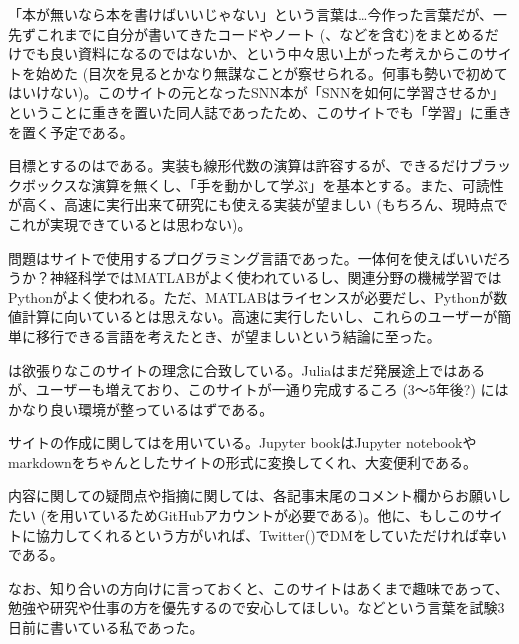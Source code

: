 \documentclass[letterpaper,10pt,english]{sphinxmanual}
\begin{document}
「本が無いなら本を書けばいいじゃない」という言葉は…今作った言葉だが、一先ずこれまでに自分が書いてきたコードやノート (、などを含む)をまとめるだけでも良い資料になるのではないか、という中々思い上がった考えからこのサイトを始めた (目次を見るとかなり無謀なことが察せられる。何事も勢いで初めてはいけない)。このサイトの元となったSNN本が「SNNを如何に学習させるか」ということに重きを置いた同人誌であったため、このサイトでも「学習」に重きを置く予定である。

目標とするのはである。実装も線形代数の演算は許容するが、できるだけブラックボックスな演算を無くし、「手を動かして学ぶ」を基本とする。また、可読性が高く、高速に実行出来て研究にも使える実装が望ましい (もちろん、現時点でこれが実現できているとは思わない)。

問題はサイトで使用するプログラミング言語であった。一体何を使えばいいだろうか？神経科学ではMATLABがよく使われているし、関連分野の機械学習ではPythonがよく使われる。ただ、MATLABはライセンスが必要だし、Pythonが数値計算に向いているとは思えない。高速に実行したいし、これらのユーザーが簡単に移行できる言語を考えたとき、が望ましいという結論に至った。

は欲張りなこのサイトの理念に合致している。Juliaはまだ発展途上ではあるが、ユーザーも増えており、このサイトが一通り完成するころ (3～5年後?) にはかなり良い環境が整っているはずである。

サイトの作成に関してはを用いている。Jupyter bookはJupyter notebookやmarkdownをちゃんとしたサイトの形式に変換してくれ、大変便利である。

内容に関しての疑問点や指摘に関しては、各記事末尾のコメント欄からお願いしたい (を用いているためGitHubアカウントが必要である)。他に、もしこのサイトに協力してくれるという方がいれば、Twitter()でDMをしていただければ幸いである。

なお、知り合いの方向けに言っておくと、このサイトはあくまで趣味であって、勉強や研究や仕事の方を優先するので安心してほしい。などという言葉を試験3日前に書いている私であった。
\end{document}
